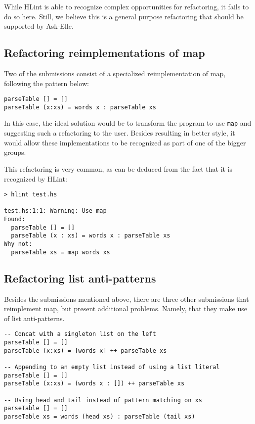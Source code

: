 While HLint is able to recognize complex opportunities for refactoring, it fails to do so here. Still, we believe this is a general purpose refactoring that should be supported by Ask-Elle.

\subsection{Refactoring reimplementations of map}

Two of the submissions consist of a specialized reimplementation of map, following the pattern below:

\begin{verbatim}
parseTable [] = []
parseTable (x:xs) = words x : parseTable xs
\end{verbatim}

In this case, the ideal solution would be to transform the program to use \texttt{map} and suggesting such a refactoring to the user. Besides resulting in better style, it would allow these implementations to be recognized as part of one of the bigger groups.

This refactoring is very common, as can be deduced from the fact that it is recognized by HLint:

\begin{lstlisting}
> hlint test.hs

test.hs:1:1: Warning: Use map
Found:
  parseTable [] = []
  parseTable (x : xs) = words x : parseTable xs
Why not:
  parseTable xs = map words xs
\end{lstlisting}

\subsection{Refactoring list anti-patterns}

Besides the submissions mentioned above, there are three other submissions that reimplement map, but present additional problems. Namely, that they make use of list anti-patterns.

\begin{verbatim}
-- Concat with a singleton list on the left
parseTable [] = []
parseTable (x:xs) = [words x] ++ parseTable xs

-- Appending to an empty list instead of using a list literal
parseTable [] = []
parseTable (x:xs) = (words x : []) ++ parseTable xs

-- Using head and tail instead of pattern matching on xs
parseTable [] = []
parseTable xs = words (head xs) : parseTable (tail xs)
\end{verbatim}

